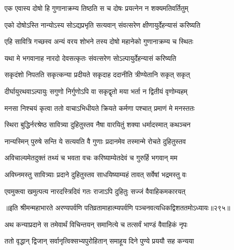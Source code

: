 \begin{center}

\twolineshloka
{एक एवास्य दोषो हि गुणानाक्रम्य तिष्ठति}
{स च दोषः प्रयत्नेन न शक्यमतिवर्तितुम्}

\twolineshloka
{एको दोषोऽस्ति नान्योऽस्य सोऽद्यप्रभृति सत्यवान्}
{संवत्सरेण क्षीणायुर्देहन्यासं करिष्यति}


\twolineshloka
{एहि सावित्रि गच्छस्व अन्यं वरय शोभने}
{तस्य दोषो महानेको गुणानाक्रम्य च स्थितः}

\twolineshloka
{यथा मे भगवानाह नारदो देवसत्कृतः}
{संवत्सरेण सोऽल्पायुर्देहन्यासं करिष्यति}


\twolineshloka
{सकृदंशो निपतति सकृत्कन्या प्रदीयते}
{सकृदाह ददानीति त्रीण्येतानि सकृत् सकृत्}

\twolineshloka
{दीर्घायुरथवाऽल्पायुः सगुणो निर्गुणोऽपि वा}
{सकृद्वृतो मया भर्ता न द्वितीयं वृणोम्यहम्}

\twolineshloka
{मनसा निश्चयं कृत्वा ततो वाचाऽभिधीयते}
{क्रियते कर्मणा पश्चात् प्रमाणं मे मनस्ततः}


\twolineshloka
{स्थिरा बुद्धिर्नरश्रेष्ठ सावित्र्या दुहितुस्तव}
{नैषा वारयितुं शक्या धर्मादस्मात् कथञ्चन}

\twolineshloka
{नान्यस्मिन् पुरुषे सन्ति ये सत्यवति वै गुणाः}
{प्रदानमेव तस्मान्मे रोचते दुहितुस्तव}


\twolineshloka
{अविचाल्यमेतदुक्तं तथ्यं च भवता वचः}
{करिष्याम्येतदेवं च गुरुर्हि भगवान् मम}


\twolineshloka
{अविघ्नमस्तु सावित्र्याः प्रदाने दुहितुस्तव}
{साधयिष्याम्यहं तावत् सर्वेषां भद्रमस्तु वः}


\twolineshloka
{एवमुक्त्वा खमुत्पत्य नारदस्त्रिदिवं गतः}
{राजाऽपि दुहितुः सज्जं वैवाहिकमकारयत्}

॥इति श्रीमन्महाभारते अरण्यपर्वणि पतिव्रतामाहात्म्यपर्वणि पञ्चनवत्यधिकद्विशततमोऽध्यायः॥२९५॥

\resetShloka


\twolineshloka
{अथ कन्याप्रदाने स तमेवार्थं विचिन्तयन्}
{समानित्ये च तत्सर्वं भाण्डं वैवाहिकं नृपः}

\twolineshloka
{ततो वृद्धान् द्विजान् सर्वानृत्विक्सभ्यपुरोहितान्}
{समाहूय दिने पुण्ये प्रययौ सह कन्यया}


\end{center}
